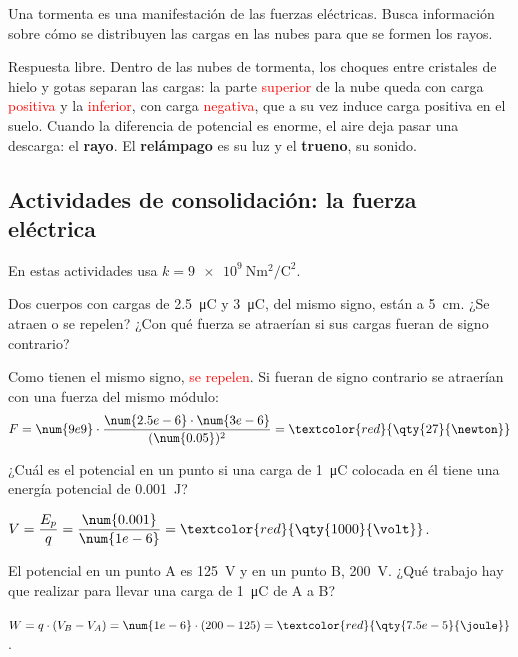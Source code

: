 \begin{exercise}
    Una tormenta es una manifestación de las fuerzas eléctricas. Busca información sobre cómo se distribuyen las cargas en las nubes para que se formen los rayos.
    \begin{solu}
        Respuesta libre. Dentro de las nubes de tormenta, los choques entre cristales de hielo y gotas separan las cargas: la parte \textcolor{red}{superior} de la nube queda con carga \textcolor{red}{positiva} y la \textcolor{red}{inferior}, con carga \textcolor{red}{negativa}, que a su vez induce carga positiva en el suelo. Cuando la diferencia de potencial es enorme, el aire deja pasar una descarga: el \textbf{rayo}. El \textbf{relámpago} es su luz y el \textbf{trueno}, su sonido.
    \end{solu}
\end{exercise}

\subsection*{Actividades de consolidación: la fuerza eléctrica}

En estas actividades usa \(k = \qty{9e9}{\newton\square\m\per\square\coulomb}\).

\begin{exercise}
    Dos cuerpos con cargas de \qty{2.5}{\micro\coulomb} y \qty{3}{\micro\coulomb}, del mismo signo, están a \qty{5}{\cm}. ¿Se atraen o se repelen? ¿Con qué fuerza se atraerían si sus cargas fueran de signo contrario?
    \begin{solu}
        Como tienen el mismo signo, \textcolor{red}{se repelen}. Si fueran de signo contrario se atraerían con una fuerza del mismo módulo:
        \[ F = \num{9e9} \cdot \frac{\num{2.5e-6} \cdot \num{3e-6}}{(\num{0.05})^2} = \textcolor{red}{\qty{27}{\newton}} \]
    \end{solu}
\end{exercise}

\begin{exercise}
    ¿Cuál es el potencial en un punto si una carga de \qty{1}{\micro\coulomb} colocada en él tiene una energía potencial de \qty{0.001}{\joule}?
    \begin{solu}
        \(V = \dfrac{E_p}{q} = \dfrac{\num{0.001}}{\num{1e-6}} = \textcolor{red}{\qty{1000}{\volt}}\).
    \end{solu}
\end{exercise}

\begin{exercise}
    El potencial en un punto A es \qty{125}{\volt} y en un punto B, \qty{200}{\volt}. ¿Qué trabajo hay que realizar para llevar una carga de \qty{1}{\micro\coulomb} de A a B?
    \begin{solu}
        \(W = q \cdot (V_B - V_A) = \num{1e-6} \cdot (200 - 125) = \textcolor{red}{\qty{7.5e-5}{\joule}}\).
    \end{solu}
\end{exercise}

